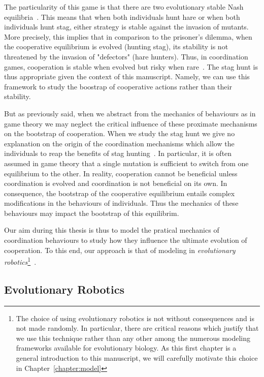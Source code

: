     The particularity of this game is that there are two evolutionary stable Nash equilibria~\parencite{Nash1950, MaynardSmith1973}. This means that when both individuals hunt hare or when both individuals hunt stag, either strategy is stable against the invasion of mutants. More precisely, this implies that in comparison to the prisoner's dilemma, when the cooperative equilibrium is evolved (hunting stag), its stability is not threatened by the invasion of "defectors" (hare hunters). Thus, in coordination games, cooperation is stable when evolved but risky when rare~\parencite{Forber2015}. The stag hunt is thus appropriate given the context of this manuscript. Namely, we can use this framework to study the boostrap of cooperative actions rather than their stability.

    But as previously said, when we abstract from the mechanics of behaviours as in game theory we may neglect the critical influence of these proximate mechanisms on the bootstrap of cooperation. When we study the stag hunt we give no explanation on the origin of the coordination mechanisms which allow the individuals to reap the benefits of stag hunting~\parencite{Calcott2007a}. In particular, it is often assumed in game theory that a single mutation is sufficient to switch from one equilibrium to the other. In reality, cooperation cannot be beneficial unless coordination is evolved and coordination is not beneficial on its own. In consequence, the bootstrap of the cooperative equilibrium entails complex modifications in the behaviours of individuals. Thus the mechanics of these behaviours may impact the bootstrap of this equilibrim.

    Our aim during this thesis is thus to model the pratical mechanics of coordination behaviours to study how they influence the ultimate evolution of cooperation. To this end, our approach is that of modeling in \emph{evolutionary robotics}\footnote{The choice of using evolutionary robotics is not without consequences and is not made randomly. In particular, there are critical reasons which justify that we use this technique rather than any other among the numerous modeling frameworks available for evolutionary biology. As this first chapter is a general introduction to this manuscript, we will carefully motivate this choice in Chapter~\ref{chapter:model}}~\parencite{Nolfi2000}.


  \subsection{Evolutionary Robotics}

